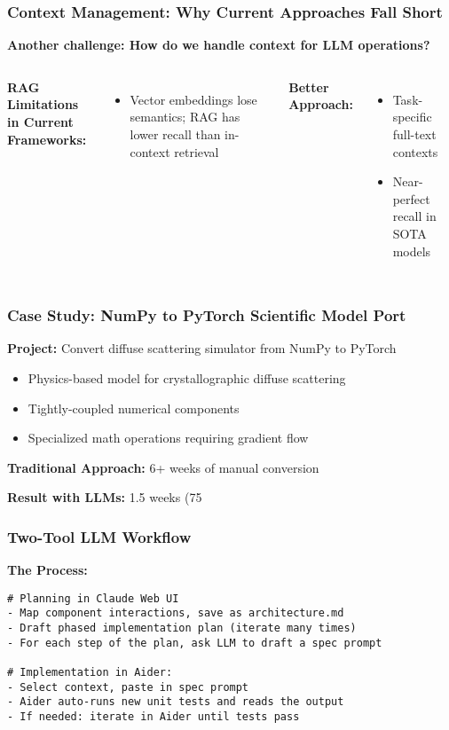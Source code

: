\documentclass{beamer}
\begin{document}
\begin{frame}
\frametitle{Context Management: Why Current Approaches Fall Short}

\centering
\textbf{Another challenge: How do we handle context for LLM operations?}

\begin{columns}
\textbf{RAG Limitations in Current Frameworks:}
\begin{itemize}
\item Vector embeddings lose semantics; RAG has lower recall than in-context retrieval
\end{itemize}

\textbf{Better Approach:}
\begin{itemize}
\item Task-specific full-text contexts
\item Near-perfect recall in SOTA models
\end{itemize}
\end{columns}

\centering
\vspace{0.3cm}
\end{frame}

\begin{frame}[fragile]
\frametitle{Case Study: NumPy to PyTorch Scientific Model Port}

\textbf{Project:} Convert diffuse scattering simulator from NumPy to PyTorch
\begin{itemize}
\item Physics-based model for crystallographic diffuse scattering
\item Tightly-coupled numerical components
\item Specialized math operations requiring gradient flow
\end{itemize}

\vspace{0.2cm}
\textbf{Traditional Approach:} 6+ weeks of manual conversion

\vspace{0.2cm}
\textbf{Result with LLMs:} 1.5 weeks (75%
\end{frame}

\begin{frame}[fragile]
\frametitle{Two-Tool LLM Workflow}

\textbf{The Process:}
\begin{lstlisting}[basicstyle=\ttfamily\footnotesize]
# Planning in Claude Web UI
- Map component interactions, save as architecture.md
- Draft phased implementation plan (iterate many times)
- For each step of the plan, ask LLM to draft a spec prompt

# Implementation in Aider:
- Select context, paste in spec prompt
- Aider auto-runs new unit tests and reads the output
- If needed: iterate in Aider until tests pass
\end{lstlisting}
\end{frame}
\end{document}
